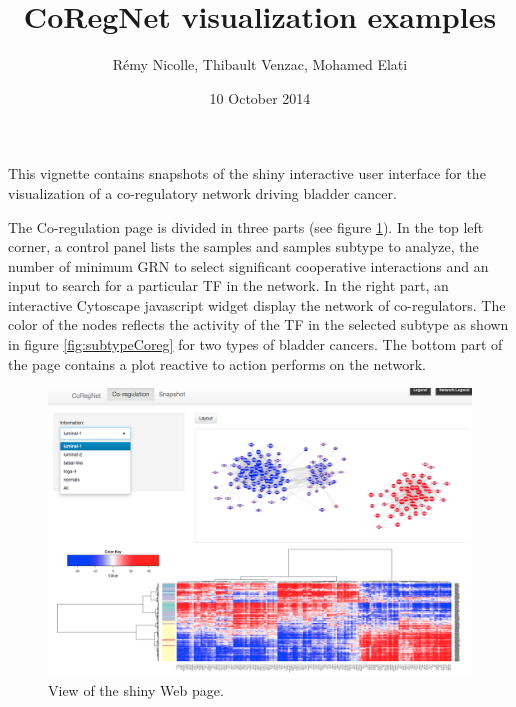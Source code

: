 \documentclass[12pt]{article}
\begin{document}


\title{CoRegNet visualization examples}
\author{R\'emy Nicolle, Thibault Venzac, Mohamed Elati}
\date{10 October 2014}
\maketitle

This vignette contains snapshots of the shiny interactive user interface for the visualization of a co-regulatory network driving  bladder cancer.


The Co-regulation page is divided in three parts (see figure \ref{fig:webpage}).
In the top left corner, a control panel lists the samples and samples subtype to analyze, the number of minimum GRN to select significant cooperative interactions and an input to search for a particular TF in the network.
In the right part, an interactive Cytoscape javascript widget display the network of co-regulators. The color of the nodes reflects the activity of the TF in the selected subtype as shown in figure \ref{fig:subtypeCoreg} for two types of bladder cancers.
The bottom part of the page contains a plot reactive to action performs on the network.



\begin{figure}
\caption{View of the shiny Web page.}
\label{fig:webpage}
\includegraphics{fig/wholeApp}
\end{figure}

\newpage
\end{document}
